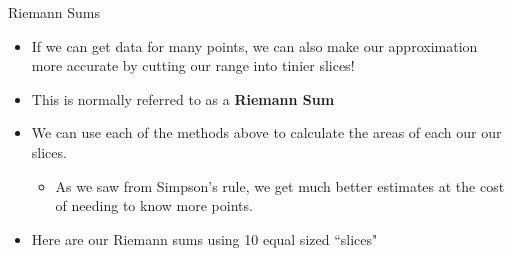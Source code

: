 {}\documentclass[letterpaper,
compress,
xcolor=x11names,
]{beamer}
\begin{document}
\begin{frame}{Riemann Sums}
	\footnotesize
	\begin{itemize}
		\item If we can get data for many points, we can also make our approximation more accurate by cutting our range into tinier slices!
		\item This is normally referred to as a \textbf{Riemann Sum}
		\item<2-> We can use each of the methods above to calculate the areas of each our our slices.
		\begin{itemize}
			\item As we saw from Simpson's rule, we get much better estimates at the cost of needing to know more points.
		\end{itemize}
		\item<3-> Here are our Riemann sums using 10 equal sized ``slices"
	\end{itemize}
	\begin{center}
	\end{center}
\end{frame}

\end{document}
